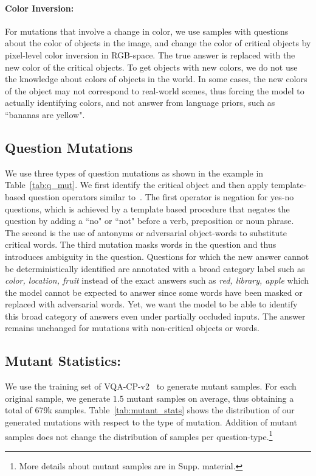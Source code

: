         \paragraph{Color Inversion:}
        For mutations that involve a change in color, we use samples with questions about the color of objects in the image, and change the color of critical objects by pixel-level color inversion in RGB-space.
        The true answer is replaced with the new color of the critical objects.
        To get objects with new colors, we do not use the knowledge about colors of objects in the world.
        In some cases, the new colors of the object may not correspond to real-world scenes, thus forcing the model to actually identifying colors, and not answer from language priors, such as ``bananas are yellow".
    
    
    \subsection{Question Mutations}
    We use three types of question mutations as shown in the example in Table~\ref{tab:q_mut}.
    We first identify the critical object and then apply template-based question operators similar to~\citep{gokhale2020vqa}.
    The first operator is negation for yes-no questions, which is achieved by a template based procedure that negates the question by adding a ``no" or ``not" before a verb, preposition or noun phrase.
    The second is the use of antonyms or adversarial object-words to substitute critical words.
    The third mutation masks words in the question and thus introduces ambiguity in the question.
    Questions for which the new answer cannot be deterministically identified are annotated with a broad category label such as \textit{color, location, fruit} instead of the exact answers such as \textit{red, library, apple} which the model cannot be expected to answer since some words have been masked or replaced with adversarial words.
    Yet, we want the model to be able to identify this broad category of answers even under partially occluded inputs.
    The answer remains unchanged for mutations with non-critical objects or words.
    
        
    \subsection{Mutant Statistics:}
    We use the training set of VQA-CP-v2~\citep{vqa-cp} to generate mutant samples.
    For each original sample, we generate $1.5$ mutant samples on average, thus obtaining a total of 679k samples.
    Table~\ref{tab:mutant_stats} shows the distribution of our generated mutations with respect to the type of mutation.
    Addition of mutant samples does not change the distribution of samples per question-type.\footnote{More details about mutant samples are in Supp. material.}
    
